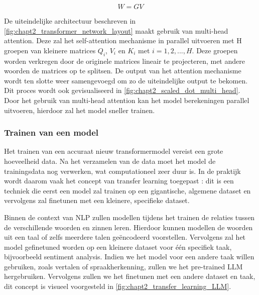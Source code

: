\begin{equation}
W = GV
\label{eq:chap2_attention_output}
\end{equation}

De uiteindelijke architectuur beschreven in \autoref{fig:chapt2_transformer_network_layout} maakt gebruik van multi-head attention. Deze zal het self-attention mechanisme in parallel uitvoeren met H groepen van kleinere matrices $Q_i$, $V_i$ en $K_i$ met $i=1,2,...,H$. Deze groepen worden verkregen door de originele matrices lineair te projecteren, met andere woorden de matrices op te splitsen. De output van het attention mechanisme wordt ten slotte weer samengevoegd om zo de uiteindelijke output te bekomen. Dit proces wordt ook gevisualiseerd in \autoref{fig:chapt2_scaled_dot_multi_head}. Door het gebruik van multi-head attention kan het model berekeningen parallel uitvoeren, hierdoor zal het model sneller trainen.


\subsubsection{Trainen van een model}
Het trainen van een accuraat nieuw transformermodel vereist een grote hoeveelheid data. Na het verzamelen van de data moet het model de trainingsdata nog verwerken, wat computationeel zeer duur is. In de praktijk wordt daarom vaak het concept van transfer learning toegepast \cite{transfer_learning_basic,transformers_datacamp}: dit is een techniek die eerst een model zal trainen op een gigantische, algemene dataset en vervolgens zal finetunen met een kleinere, specifieke dataset. 

Binnen de context van NLP zullen modellen tijdens het trainen de relaties tussen de verschillende woorden en zinnen leren. Hierdoor kunnen modellen de woorden uit een taal of zelfs meerdere talen geëncodeerd voorstellen. Vervolgens zal het model gefinetuned worden op een kleinere dataset voor één specifiek taak, bijvoorbeeld sentiment analysis. Indien we het model voor een andere taak willen gebruiken, zoals vertalen of spraakherkenning, zullen we het pre-trained LLM hergebruiken. Vervolgens zullen we het finetunen met een andere dataset en taak, dit concept is visueel voorgesteld in \autoref{fig:chapt2_transfer_learning_LLM}.

